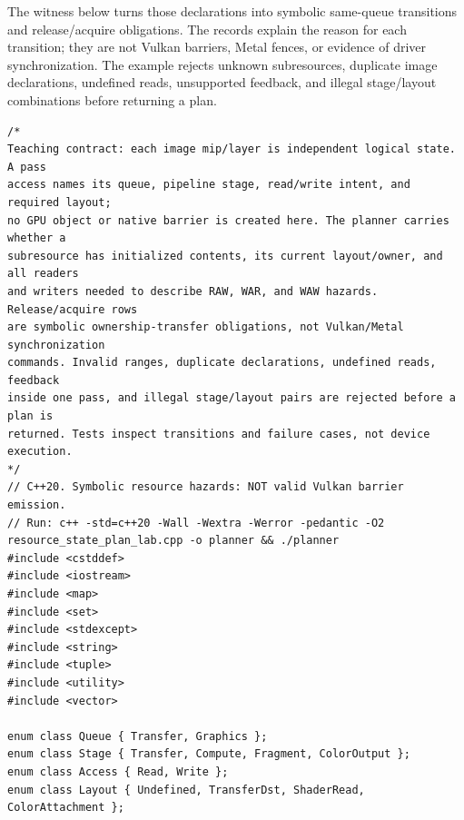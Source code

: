 The witness below turns those declarations into symbolic same-queue transitions and release/acquire obligations. The records explain the reason for each transition; they are not Vulkan barriers, Metal fences, or evidence of driver synchronization. The example rejects unknown subresources, duplicate image declarations, undefined reads, unsupported feedback, and illegal stage/layout combinations before returning a plan.

\begin{verbatim}
/*
Teaching contract: each image mip/layer is independent logical state. A pass
access names its queue, pipeline stage, read/write intent, and required layout;
no GPU object or native barrier is created here. The planner carries whether a
subresource has initialized contents, its current layout/owner, and all readers
and writers needed to describe RAW, WAR, and WAW hazards. Release/acquire rows
are symbolic ownership-transfer obligations, not Vulkan/Metal synchronization
commands. Invalid ranges, duplicate declarations, undefined reads, feedback
inside one pass, and illegal stage/layout pairs are rejected before a plan is
returned. Tests inspect transitions and failure cases, not device execution.
*/
// C++20. Symbolic resource hazards: NOT valid Vulkan barrier emission.
// Run: c++ -std=c++20 -Wall -Wextra -Werror -pedantic -O2 resource_state_plan_lab.cpp -o planner && ./planner
#include <cstddef>
#include <iostream>
#include <map>
#include <set>
#include <stdexcept>
#include <string>
#include <tuple>
#include <utility>
#include <vector>

enum class Queue { Transfer, Graphics };
enum class Stage { Transfer, Compute, Fragment, ColorOutput };
enum class Access { Read, Write };
enum class Layout { Undefined, TransferDst, ShaderRead, ColorAttachment };


\end{verbatim}
